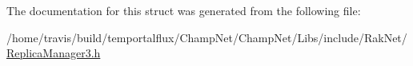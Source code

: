 The documentation for this struct was generated from the following file\-:\begin{DoxyCompactItemize}
\item 
/home/travis/build/temportalflux/\-Champ\-Net/\-Champ\-Net/\-Libs/include/\-Rak\-Net/\hyperlink{_replica_manager3_8h}{Replica\-Manager3.\-h}\end{DoxyCompactItemize}

